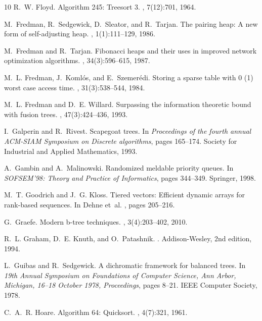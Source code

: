 \documentclass[10pt]{book}
\theoremstyle{plain}
\theoremstyle{definition}
\begin{document}
\begin{thebibliography}{10}
R.~W. Floyd.
\newblock Algorithm 245: Treesort 3.
, 7(12):701, 1964.

M.~Fredman, R.~Sedgewick, D.~Sleator, and R.~Tarjan.
\newblock The pairing heap: A new form of self-adjusting heap.
, 1(1):111--129, 1986.

M.~Fredman and R.~Tarjan.
\newblock Fibonacci heaps and their uses in improved network optimization
  algorithms.
, 34(3):596--615, 1987.

M.~L. Fredman, J.~Koml{\'o}s, and E.~Szemer{\'e}di.
\newblock Storing a sparse table with 0 (1) worst case access time.
, 31(3):538--544, 1984.

M.~L. Fredman and D.~E. Willard.
\newblock Surpassing the information theoretic bound with fusion trees.
, 47(3):424--436, 1993.

I.~Galperin and R.~Rivest.
\newblock Scapegoat trees.
\newblock In {\em Proceedings of the fourth annual ACM-SIAM Symposium on
  Discrete algorithms}, pages 165--174. Society for Industrial and Applied
  Mathematics, 1993.

A.~Gambin and A.~Malinowski.
\newblock Randomized meldable priority queues.
\newblock In {\em SOFSEM’98: Theory and Practice of Informatics}, pages
  344--349. Springer, 1998.

M.~T. Goodrich and J.~G. Kloss.
\newblock Tiered vectors: Efficient dynamic arrays for rank-based sequences.
\newblock In Dehne et~al. \cite{wads99proc}, pages 205--216.

G.~Graefe.
\newblock Modern b-tree techniques.
, 3(4):203--402, 2010.

R.~L. Graham, D.~E. Knuth, and O.~Patashnik.
.
\newblock Addison-Wesley, 2nd edition, 1994.

L.~Guibas and R.~Sedgewick.
\newblock A dichromatic framework for balanced trees.
\newblock In {\em 19th Annual Symposium on Foundations of Computer Science, Ann
  Arbor, Michigan, 16--18 October 1978, Proceedings}, pages 8--21. IEEE
  Computer Society, 1978.

C.~A.~R. Hoare.
\newblock Algorithm 64: Quicksort.
, 4(7):321, 1961.


\end{thebibliography}
\end{document}
